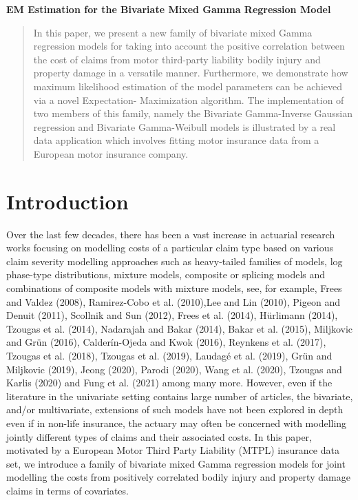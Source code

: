 \documentclass[12pt]{article}%
\theoremstyle{definition}
\theoremstyle{remark}
\begin{document}
	\tableofcontents 
	\pagebreak
	\listoftables
	\pagebreak
	\listoffigures
	\pagebreak
	\vspace{2cm}
	\begin{center}
		\textbf{EM Estimation for the Bivariate Mixed Gamma Regression
			Model}
	\end{center}
\begin{abstract}
	 In this paper, we present a new family of bivariate mixed Gamma regression models 
	for taking into account the positive correlation between the cost of claims from motor third-party 
	liability bodily injury and property damage in a versatile manner. Furthermore, we demonstrate how 
	maximum likelihood estimation of the model parameters can be achieved via a novel Expectation- 
	Maximization algorithm. The implementation of two members of this family, namely the Bivariate Gamma-Inverse Gaussian regression and  Bivariate Gamma-Weibull  
	models is illustrated by a real data application which involves fitting motor insurance data from a 
	European motor insurance company.
\end{abstract}
	

	

	
	
	
	\section{Introduction}
	Over the last few decades, there has been a vast increase in actuarial research works 
	focusing on modelling costs of a particular claim type based on various claim severity 
	modelling approaches such as heavy-tailed families of models, log phase-type distributions, 
	mixture models, composite or splicing models and combinations of composite models 
	with mixture models, see, for example, Frees and Valdez (2008), Ramirez-Cobo et al. 
	(2010),Lee and Lin (2010), Pigeon and Denuit (2011), Scollnik and Sun (2012), Frees et al. 
	(2014), Hürlimann (2014), Tzougas et al. (2014), Nadarajah and Bakar (2014), Bakar et al. 
	(2015), Miljkovic and Grün (2016), Calderín-Ojeda and Kwok (2016), Reynkens et al. (2017), 
	Tzougas et al. (2018), Tzougas et al. (2019), Laudagé et al. (2019), Grün and Miljkovic 
	(2019), Jeong (2020), Parodi (2020), Wang et al. (2020), Tzougas and Karlis (2020) and Fung 
	et al. (2021) among many more. However, even if the literature in the univariate setting 
contains large number of articles, the bivariate, and/or multivariate, extensions of such models have not been 
	explored in depth even if in non-life insurance, the actuary may often be concerned with 
	modelling jointly different types of claims and their associated costs. 
	In this paper, motivated by a European Motor Third Party Liability (MTPL) insurance 
	data set, we introduce a family of bivariate mixed Gamma 
	regression models for joint modelling the costs from positively correlated bodily injury 
	and property damage claims in terms of covariates.
	
\end{document}
